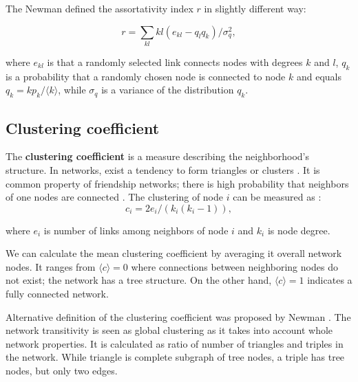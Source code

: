 The Newman defined the assortativity \cite{newman2002assortative} index $r$ in slightly different way:

\begin{equation}
r = \sum_{kl}kl(e_{kl} - q_lq_k) / \sigma_q^2 ,
\end{equation}

where $e_{kl}$ is that a randomly selected link connects nodes with degrees $k$ and $l$, $q_k$ is a probability that a randomly chosen node is connected to node $k$ and equals $q_k = kp_k / \langle k \rangle$, while $\sigma_q$ is a variance of the distribution $q_k$. 

\subsection{Clustering coefficient}

The \textbf{clustering coefficient} is a measure describing the neighborhood's structure. In networks, exist a tendency to form triangles or clusters \cite{barabasi2016network}. It is common property of friendship networks; there is high probability that neighbors of one nodes are connected \cite{mata2020complex}. The clustering of node $i$ can be measured  as \cite{watts1998collective}: 
\begin{equation}
c_i=2e_i/(k_i(k_i-1)),
\end{equation}

where $e_i$ is number of links among neighbors of node $i$ and $k_i$ is node degree. 

We can calculate the mean clustering coefficient by averaging it overall network nodes. It ranges from  $\langle c \rangle = 0$ where connections between neighboring nodes do not exist; the network has a tree structure. On the other hand, $\langle c \rangle = 1$ indicates a fully connected network.

Alternative definition of the clustering coefficient was proposed by Newman \cite{newman2009random}. The network transitivity is seen as global clustering as it takes into account whole network properties. It is calculated as ratio of number of triangles and triples in the network. While triangle is complete subgraph of tree nodes, a triple has tree nodes, but only two edges. 


